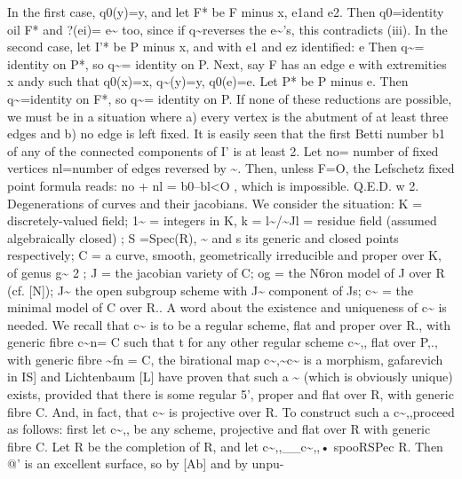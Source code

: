 \documentclass[11pt]{article}
\theoremstyle{plain}
\theoremstyle{definition}
\theoremstyle{remark}
\begin{document}
In the first case, q0(y)=y, and let F* be F minus x, e1and e2. Then q0=identity oil F* and ?(ei)= e\textasciitilde{} too, since if q\textasciitilde{}reverses the e\textasciitilde{}'s, this contradicts (iii). In the second case, let I'* be P minus x, and with e1 and ez identified: e Then q\textasciitilde{}= identity on P*, so q\textasciitilde{}= identity on P. Next, say F has an edge e with extremities x andy such that q0(x)=x, q\textasciitilde{}(y)=y, q0(e)=e. Let P* be P minus e. Then q\textasciitilde{}=identity on F*, so q\textasciitilde{}= identity on P. If none of these reductions are possible, we must be in a situation where a) every vertex is the abutment of at least three edges and b) no edge is left fixed. It is easily seen that the first Betti number b1 of any of the connected components of I' is at least 2. Let no= number of fixed vertices nl=number of edges reversed by \textasciitilde{}. Then, unless F=O, the Lefschetz fixed point formula reads: no + nl = b0--bl<O , which is impossible. Q.E.D. w 2. Degenerations of curves and their jacobians. We consider the situation: K = discretely-valued field; 1\textasciitilde{} = integers in K, k = l\textasciitilde{}/\textasciitilde{}Jl = residue field (assumed algebraically closed) ; S =Spec(R), \textasciitilde{} and s its generic and closed points respectively; C = a curve, smooth, geometrically irreducible and proper over K, of genus g\textasciitilde{} 2 ; J = the jacobian variety of C; og = the N6ron model of J over R (cf. [N]); J\textasciitilde{} the open subgroup scheme with J\textasciitilde{} component of Js; c\textasciitilde{} = the minimal model of C over R.. A word about the existence and uniqueness of c\textasciitilde{} is needed. We recall that c\textasciitilde{} is to be a regular scheme, flat and proper over R., with generic fibre c\textasciitilde{}n= C such that t for any other regular scheme c\textasciitilde{},, flat over P,., with generic fibre \textasciitilde{}fn = C, the birational map c\textasciitilde{},\textasciitilde{}c\textasciitilde{} is a morphism, gafarevich in IS] and Lichtenbaum [L] have proven that such a \textasciitilde{} (which is obviously unique) exists, provided that there is some regular 5', proper and flat over R, with generic fibre C. And, in fact, that c\textasciitilde{} is projective over R. To construct such a c\textasciitilde{},,proceed as follows: first let c\textasciitilde{},, be any scheme, projective and flat over R with generic fibre C. Let R be the completion of R, and let c\textasciitilde{},,\_\_c\textasciitilde{},,• spooRSPec R. Then @' is an excellent surface, so by [Ab] and by unpu-
\end{document}
